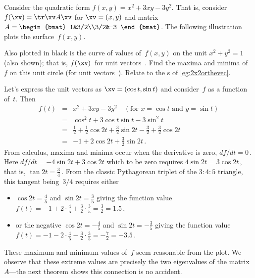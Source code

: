 \begin{example} 
Consider the quadratic form \(f(x,y)=x^2+3xy-3y^2\). 
That is, consider \(f(\xv)=\tr\xv A\xv\) for \(\xv=(x,y)\) and matrix \(A=\begin{bmat} 1&3/2\\3/2&-3 \end{bmat}\).
The following illustration plots the surface~\(f(x,y)\).
\begin{center}
\end{center}
Also plotted in black is the curve of values of~\(f(x,y)\) on the unit  \(x^2+y^2=1\) (also shown); that is, \(f(\xv)\)~for unit vectors~\xv.
Find the maxima and minima of~\(f\) on this unit circle (for unit vectors~\xv).
Relate to the s of \autoref{eg:2x2orthevec}.
\begin{solution} 
Let's express the unit vectors as \(\xv=(\cos t,\sin t)\) and consider~\(f\) as a function of~\(t\).
Then 
\begin{eqnarray*}
f(t)&=&x^2+3xy-3y^2\quad(\text{for }x=\cos t\text{ and }y=\sin t)
\\&=&\cos^2t+3\cos t\sin t-3\sin^2t
\\&=&\tfrac12+\tfrac12\cos2t+\tfrac32\sin2t -\tfrac32+\tfrac32\cos2t
\\&=&-1+2\cos2t+\tfrac32\sin2t\,.
\end{eqnarray*}
From calculus, maxima and minima occur when the derivative is zero, \(df/dt=0\)\,.
Here \(df/dt=-4\sin2t+3\cos2t\) which to be zero requires \(4\sin2t=3\cos2t\)\,, that is, \(\tan2t=\tfrac34\)\,.
From the classic Pythagorean triplet of the \(3:4:5\) triangle, this tangent being~\(3/4\) requires either \begin{itemize}
\item \(\cos2t=\tfrac45\) and \(\sin2t=\tfrac35\) giving the function value \(f(t)=-1+2\cdot\tfrac45+\tfrac32\cdot\tfrac35
=\tfrac32=1.5\)\,,
\item or the negative \(\cos2t=-\tfrac45\) and \(\sin2t=-\tfrac35\) giving the function value \(f(t)=-1-2\cdot\tfrac45-\tfrac32\cdot\tfrac35
=-\tfrac72=-3.5\)\,.
\end{itemize}
These maximum and minimum values of~\(f\) seem reasonable from the plot.
We observe that these extreme values are precisely the two eigenvalues of the matrix~\(A\)---the next theorem shows this connection is no accident.
\end{solution}
\end{example}





